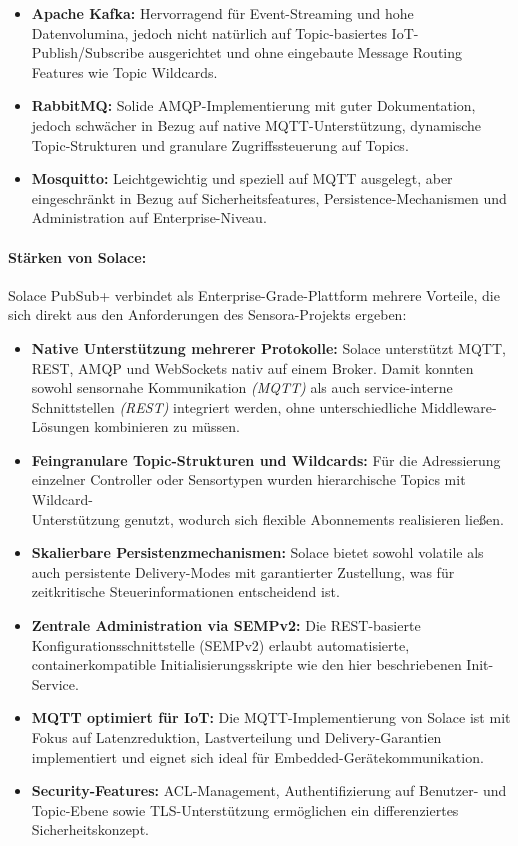 \begin{itemize}
  \item \textbf{Apache Kafka:} Hervorragend f\"ur Event-Streaming und hohe Datenvolumina, jedoch nicht nat\"urlich auf Topic-basiertes IoT-Publish/Subscribe ausgerichtet und ohne eingebaute Message Routing Features wie Topic Wildcards.\cite{mqtt_vs_kafka}
  \item \textbf{RabbitMQ:} Solide AMQP-Implementierung mit guter Dokumentation, jedoch schw\"acher in Bezug auf native MQTT-Unterst\"utzung, dynamische Topic-Strukturen und granulare Zugriffssteuerung auf Topics.
  \item \textbf{Mosquitto:} Leichtgewichtig und speziell auf MQTT ausgelegt, aber eingeschr\"ankt in Bezug auf Sicherheitsfeatures, Persistence-Mechanismen und Administration auf Enterprise-Niveau.
\end{itemize}

\paragraph*{St\"arken von Solace:}

Solace PubSub+ verbindet als Enterprise-Grade-Plattform mehrere Vorteile, die sich direkt aus den Anforderungen des Sensora-Projekts ergeben:

\begin{itemize}
  \item \textbf{Native Unterst\"utzung mehrerer Protokolle:} Solace unterst\"utzt MQTT, REST, AMQP und WebSockets nativ auf einem Broker. Damit konnten sowohl sensornahe Kommunikation \textit{(MQTT)} als auch service-interne Schnittstellen \textit{(REST)} integriert werden, ohne unterschiedliche Middleware-L\"osungen kombinieren zu m\"ussen.
  \item \textbf{Feingranulare Topic-Strukturen und Wildcards:} F\"ur die Adressierung einzelner Controller oder Sensortypen wurden hierarchische Topics mit Wildcard-\\Unterst\"utzung genutzt, wodurch sich flexible Abonnements realisieren lie\ss{}en.
  \item \textbf{Skalierbare Persistenzmechanismen:} Solace bietet sowohl volatile als auch persistente Delivery-Modes mit garantierter Zustellung, was f\"ur zeitkritische Steuerinformationen entscheidend ist.
  \item \textbf{Zentrale Administration via SEMPv2:} Die REST-basierte Konfigurationsschnittstelle (SEMPv2) erlaubt automatisierte, containerkompatible Initialisierungsskripte wie den hier beschriebenen Init-Service.
  \item \textbf{MQTT optimiert f\"ur IoT:} Die MQTT-Implementierung von Solace ist mit Fokus auf Latenzreduktion, Lastverteilung und Delivery-Garantien implementiert und eignet sich ideal f\"ur Embedded-Ger\"atekommunikation.
  \item \textbf{Security-Features:} ACL-Management, Authentifizierung auf Benutzer- und Topic-Ebene sowie TLS-Unterst\"utzung erm\"oglichen ein differenziertes Sicherheitskonzept.
\end{itemize}


